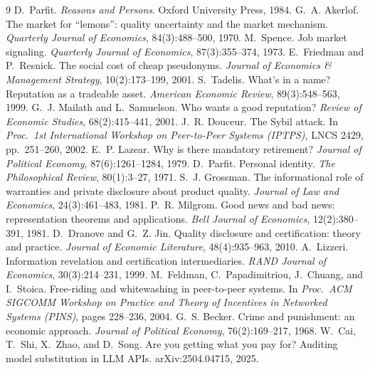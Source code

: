 \documentclass[11pt,a4paper]{article}
\begin{document}
\begin{thebibliography}{9}
 D.~Parfit. \emph{Reasons and Persons}. Oxford University Press, 1984.
 G.~A. Akerlof. The market for ``lemons'': quality uncertainty and the market mechanism. \emph{Quarterly Journal
of Economics}, 84(3):488--500, 1970.
 M.~Spence. Job market signaling. \emph{Quarterly Journal of Economics}, 87(3):355--374, 1973.
 E.~Friedman and P.~Resnick. The social cost of cheap pseudonyms. \emph{Journal of Economics \&
Management Strategy}, 10(2):173--199, 2001.
 S.~Tadelis. What's in a name? Reputation as a tradeable asset. \emph{American Economic Review}, 89(3):548--563,
1999.
 G.~J. Mailath and L.~Samuelson. Who wants a good reputation? \emph{Review of Economic Studies},
68(2):415--441, 2001.
 J.~R. Douceur. The Sybil attack. In \emph{Proc.\ 1st International Workshop on Peer-to-Peer Systems (IPTPS)},
LNCS 2429, pp.~251--260, 2002.
 E.~P. Lazear. Why is there mandatory retirement? \emph{Journal of Political Economy}, 87(6):1261--1284, 1979.
 D.~Parfit. Personal identity. \emph{The Philosophical Review}, 80(1):3--27, 1971.
 S.~J. Grossman. The informational role of warranties and private disclosure about product quality.
\emph{Journal of Law and Economics}, 24(3):461--483, 1981.
 P.~R. Milgrom. Good news and bad news: representation theorems and applications. \emph{Bell Journal of
Economics}, 12(2):380--391, 1981.
 D.~Dranove and G.~Z. Jin. Quality disclosure and certification: theory and practice. \emph{Journal of
Economic Literature}, 48(4):935--963, 2010.
 A.~Lizzeri. Information revelation and certification intermediaries. \emph{RAND Journal of Economics},
30(3):214--231, 1999.
 M.~Feldman, C.~Papadimitriou, J.~Chuang, and I.~Stoica. Free-riding and whitewashing in peer-to-peer
systems. In \emph{Proc.\ ACM SIGCOMM Workshop on Practice and Theory of Incentives in Networked Systems (PINS)}, pages
228--236, 2004.
 G.~S. Becker. Crime and punishment: an economic approach. \emph{Journal of Political Economy},
76(2):169--217, 1968.
 W.~Cai, T.~Shi, X.~Zhao, and D.~Song. Are you getting what you pay for? Auditing model substitution in LLM
APIs. arXiv:2504.04715, 2025.
\end{thebibliography}
\end{document}
